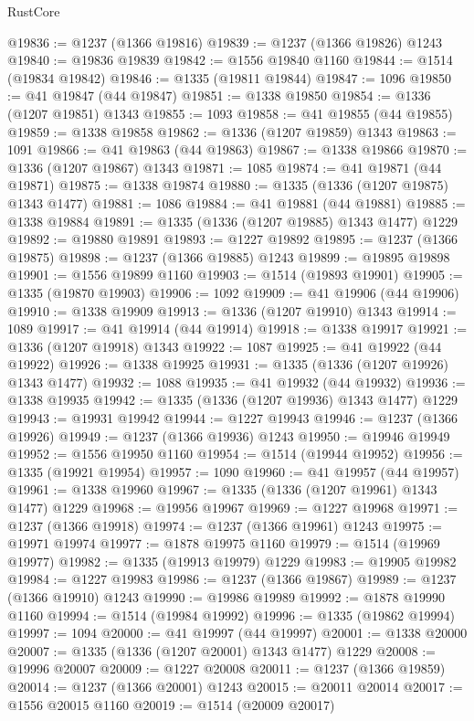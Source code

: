\begin{lexlean}{RustCore}
\begin{coremodule}
@19836 := @1237 (@1366 @19816)
@19839 := @1237 (@1366 @19826) @1243
@19840 := @19836 @19839
@19842 := @1556 @19840 @1160
@19844 := @1514 (@19834 @19842)
@19846 := @1335 (@19811 @19844)
@19847 := 1096
@19850 := @41 @19847 (@44 @19847)
@19851 := @1338 @19850
@19854 := @1336 (@1207 @19851) @1343
@19855 := 1093
@19858 := @41 @19855 (@44 @19855)
@19859 := @1338 @19858
@19862 := @1336 (@1207 @19859) @1343
@19863 := 1091
@19866 := @41 @19863 (@44 @19863)
@19867 := @1338 @19866
@19870 := @1336 (@1207 @19867) @1343
@19871 := 1085
@19874 := @41 @19871 (@44 @19871)
@19875 := @1338 @19874
@19880 := @1335 (@1336 (@1207 @19875) @1343 @1477)
@19881 := 1086
@19884 := @41 @19881 (@44 @19881)
@19885 := @1338 @19884
@19891 := @1335 (@1336 (@1207 @19885) @1343 @1477) @1229
@19892 := @19880 @19891
@19893 := @1227 @19892
@19895 := @1237 (@1366 @19875)
@19898 := @1237 (@1366 @19885) @1243
@19899 := @19895 @19898
@19901 := @1556 @19899 @1160
@19903 := @1514 (@19893 @19901)
@19905 := @1335 (@19870 @19903)
@19906 := 1092
@19909 := @41 @19906 (@44 @19906)
@19910 := @1338 @19909
@19913 := @1336 (@1207 @19910) @1343
@19914 := 1089
@19917 := @41 @19914 (@44 @19914)
@19918 := @1338 @19917
@19921 := @1336 (@1207 @19918) @1343
@19922 := 1087
@19925 := @41 @19922 (@44 @19922)
@19926 := @1338 @19925
@19931 := @1335 (@1336 (@1207 @19926) @1343 @1477)
@19932 := 1088
@19935 := @41 @19932 (@44 @19932)
@19936 := @1338 @19935
@19942 := @1335 (@1336 (@1207 @19936) @1343 @1477) @1229
@19943 := @19931 @19942
@19944 := @1227 @19943
@19946 := @1237 (@1366 @19926)
@19949 := @1237 (@1366 @19936) @1243
@19950 := @19946 @19949
@19952 := @1556 @19950 @1160
@19954 := @1514 (@19944 @19952)
@19956 := @1335 (@19921 @19954)
@19957 := 1090
@19960 := @41 @19957 (@44 @19957)
@19961 := @1338 @19960
@19967 := @1335 (@1336 (@1207 @19961) @1343 @1477) @1229
@19968 := @19956 @19967
@19969 := @1227 @19968
@19971 := @1237 (@1366 @19918)
@19974 := @1237 (@1366 @19961) @1243
@19975 := @19971 @19974
@19977 := @1878 @19975 @1160
@19979 := @1514 (@19969 @19977)
@19982 := @1335 (@19913 @19979) @1229
@19983 := @19905 @19982
@19984 := @1227 @19983
@19986 := @1237 (@1366 @19867)
@19989 := @1237 (@1366 @19910) @1243
@19990 := @19986 @19989
@19992 := @1878 @19990 @1160
@19994 := @1514 (@19984 @19992)
@19996 := @1335 (@19862 @19994)
@19997 := 1094
@20000 := @41 @19997 (@44 @19997)
@20001 := @1338 @20000
@20007 := @1335 (@1336 (@1207 @20001) @1343 @1477) @1229
@20008 := @19996 @20007
@20009 := @1227 @20008
@20011 := @1237 (@1366 @19859)
@20014 := @1237 (@1366 @20001) @1243
@20015 := @20011 @20014
@20017 := @1556 @20015 @1160
@20019 := @1514 (@20009 @20017)

\end{coremodule}
\end{lexlean}
